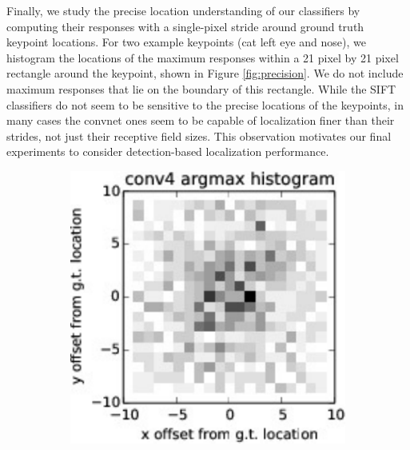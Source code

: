\documentclass{article} %
\begin{document}
Finally, we study the precise location understanding of our classifiers
by computing their responses with a single-pixel stride around
ground truth keypoint locations.
For two example keypoints (cat left eye and nose), we histogram the locations of
the maximum responses within a 21 pixel by 21 pixel rectangle around the
keypoint, shown in Figure \ref{fig:precision}.
We do not include maximum responses that lie on the boundary of this rectangle.
While the SIFT classifiers do not seem to be sensitive to the precise locations of
the keypoints, in many cases the convnet ones seem to be capable of localization
finer than their strides, not just their receptive field sizes. This observation 
motivates our final experiments to consider detection-based localization performance.

\begin{figure}[t]
\centering
\begin{minipage}{0.4\textwidth}
\centering
\begin{subfigure}{0.45\textwidth}
    \includegraphics[width=\textwidth]{figures/fine_cat_eye_conv4.pdf}


\end{subfigure}
\end{minipage}
\end{figure}
\end{document}
